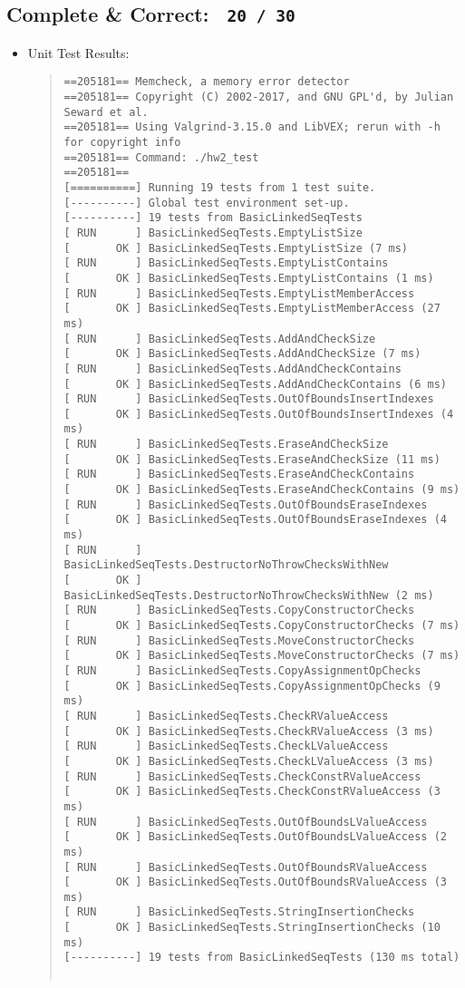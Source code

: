 \documentclass[10pt]{article}
\def \SCORECOMPLETE {20 / 30}
\begin{document}
\subsection*{Complete \& Correct:~ {\tt \SCORECOMPLETE}}
\begin{itemize}
\item Unit Test Results:
\begin{scriptsize}
\begin{quote}
\begin{verbatim}
==205181== Memcheck, a memory error detector
==205181== Copyright (C) 2002-2017, and GNU GPL'd, by Julian Seward et al.
==205181== Using Valgrind-3.15.0 and LibVEX; rerun with -h for copyright info
==205181== Command: ./hw2_test
==205181== 
[==========] Running 19 tests from 1 test suite.
[----------] Global test environment set-up.
[----------] 19 tests from BasicLinkedSeqTests
[ RUN      ] BasicLinkedSeqTests.EmptyListSize
[       OK ] BasicLinkedSeqTests.EmptyListSize (7 ms)
[ RUN      ] BasicLinkedSeqTests.EmptyListContains
[       OK ] BasicLinkedSeqTests.EmptyListContains (1 ms)
[ RUN      ] BasicLinkedSeqTests.EmptyListMemberAccess
[       OK ] BasicLinkedSeqTests.EmptyListMemberAccess (27 ms)
[ RUN      ] BasicLinkedSeqTests.AddAndCheckSize
[       OK ] BasicLinkedSeqTests.AddAndCheckSize (7 ms)
[ RUN      ] BasicLinkedSeqTests.AddAndCheckContains
[       OK ] BasicLinkedSeqTests.AddAndCheckContains (6 ms)
[ RUN      ] BasicLinkedSeqTests.OutOfBoundsInsertIndexes
[       OK ] BasicLinkedSeqTests.OutOfBoundsInsertIndexes (4 ms)
[ RUN      ] BasicLinkedSeqTests.EraseAndCheckSize
[       OK ] BasicLinkedSeqTests.EraseAndCheckSize (11 ms)
[ RUN      ] BasicLinkedSeqTests.EraseAndCheckContains
[       OK ] BasicLinkedSeqTests.EraseAndCheckContains (9 ms)
[ RUN      ] BasicLinkedSeqTests.OutOfBoundsEraseIndexes
[       OK ] BasicLinkedSeqTests.OutOfBoundsEraseIndexes (4 ms)
[ RUN      ] BasicLinkedSeqTests.DestructorNoThrowChecksWithNew
[       OK ] BasicLinkedSeqTests.DestructorNoThrowChecksWithNew (2 ms)
[ RUN      ] BasicLinkedSeqTests.CopyConstructorChecks
[       OK ] BasicLinkedSeqTests.CopyConstructorChecks (7 ms)
[ RUN      ] BasicLinkedSeqTests.MoveConstructorChecks
[       OK ] BasicLinkedSeqTests.MoveConstructorChecks (7 ms)
[ RUN      ] BasicLinkedSeqTests.CopyAssignmentOpChecks
[       OK ] BasicLinkedSeqTests.CopyAssignmentOpChecks (9 ms)
[ RUN      ] BasicLinkedSeqTests.CheckRValueAccess
[       OK ] BasicLinkedSeqTests.CheckRValueAccess (3 ms)
[ RUN      ] BasicLinkedSeqTests.CheckLValueAccess
[       OK ] BasicLinkedSeqTests.CheckLValueAccess (3 ms)
[ RUN      ] BasicLinkedSeqTests.CheckConstRValueAccess
[       OK ] BasicLinkedSeqTests.CheckConstRValueAccess (3 ms)
[ RUN      ] BasicLinkedSeqTests.OutOfBoundsLValueAccess
[       OK ] BasicLinkedSeqTests.OutOfBoundsLValueAccess (2 ms)
[ RUN      ] BasicLinkedSeqTests.OutOfBoundsRValueAccess
[       OK ] BasicLinkedSeqTests.OutOfBoundsRValueAccess (3 ms)
[ RUN      ] BasicLinkedSeqTests.StringInsertionChecks
[       OK ] BasicLinkedSeqTests.StringInsertionChecks (10 ms)
[----------] 19 tests from BasicLinkedSeqTests (130 ms total)


\end{verbatim}
\end{quote}
\end{scriptsize}
\end{itemize}
\end{document}
